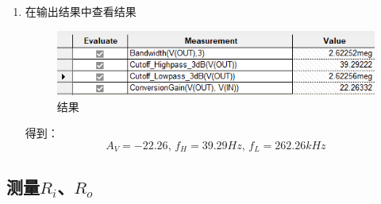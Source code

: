 \documentclass{../source/Experiment}
\begin{document}
\begin{enumerate}
\begin{figure}[h]
                \end{figure}
            \item 在输出结果中查看结果
                \newpage
                \begin{figure}[h]
                    \centering
                    \includegraphics[scale = 1]{pic/结果2}
                    \caption{结果}
                \end{figure}
                得到：
                $$A_V = -22.26,\, f_H  = 39.29Hz,\, f_L = 262.26kHz$$
        \end{enumerate}
        \subsection{测量$R_i$、$R_o$}
\end{document}
